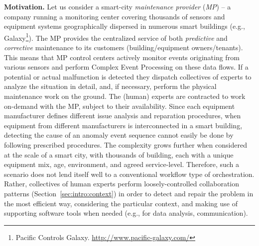 \documentclass{llncs}
\begin{document}
  \textbf{Motivation. }
  Let us consider a smart-city \emph{maintenance provider} (\emph{MP}) -- a company running a monitoring center covering thousands of sensors and equipment systems geographically dispersed in numerous smart buildings (e.g., Galaxy\footnote{Pacific Controls Galaxy. \url{http://www.pacific-galaxy.com/}}). The MP provides the centralized service of both \emph{predictive} and \emph{corrective} maintenance to its customers (building/equipment owners/tenants). This means that MP control centers actively monitor events originating from various sensors and perform Complex Event Processing on these data flows. If a potential or actual malfunction is detected they dispatch collectives of experts to analyze the situation in detail, and, if necessary, perform the physical maintenance work on the ground. The (human) experts are contracted to work on-demand with the MP, subject to their availability.
  Since each equipment manufacturer defines different issue analysis and reparation procedures, when equipment from different manufacturers is interconnected in a smart building, detecting the cause of an anomaly event sequence cannot easily be done by following prescribed procedures. The complexity grows further when considered at the scale of a smart city, with thousands of building, each with a unique equipment mix, age, environment, and agreed service-level. Therefore, such a scenario does not lend itself well to a conventional workflow type of orchestration. Rather, collectives of human experts perform loosely-controlled collaboration patterns (Section~\ref{sec:intro:context}) in order to detect and repair the problem in the most efficient way, considering the particular context, and making use of supporting software tools when needed (e.g., for data analysis, communication). 
\end{document}
